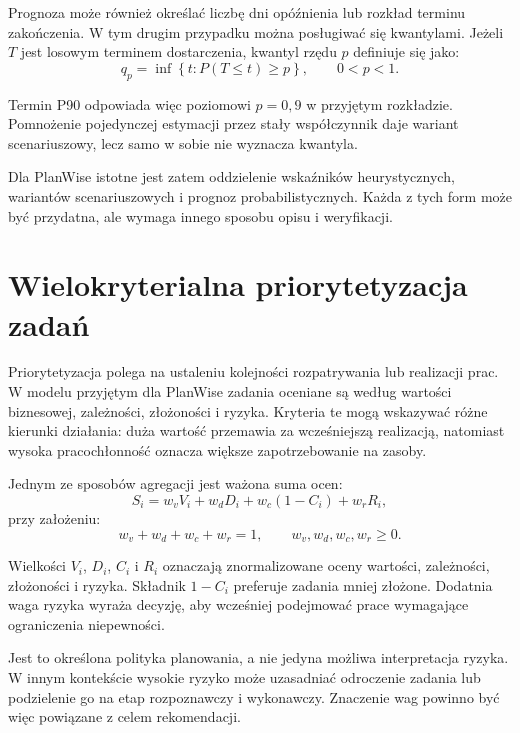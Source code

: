 Prognoza może również określać liczbę dni opóźnienia lub rozkład terminu zakończenia. W tym drugim przypadku można posługiwać się kwantylami. Jeżeli \(T\) jest losowym terminem dostarczenia, kwantyl rzędu \(p\) definiuje się jako:
\begin{equation}
    q_p = \inf\left\{t : P(T \leq t) \geq p\right\},
    \qquad 0 < p < 1.
    \label{eq:kwantyl-terminu}
\end{equation}

Termin P90 odpowiada więc poziomowi \(p = 0{,}9\) w przyjętym rozkładzie. Pomnożenie pojedynczej estymacji przez stały współczynnik daje wariant scenariuszowy, lecz samo w sobie nie wyznacza kwantyla.

Dla PlanWise istotne jest zatem oddzielenie wskaźników heurystycznych, wariantów scenariuszowych i prognoz probabilistycznych. Każda z tych form może być przydatna, ale wymaga innego sposobu opisu i weryfikacji.


\section{Wielokryterialna priorytetyzacja zadań}
\label{sec:priorytetyzacja-zadan}

Priorytetyzacja polega na ustaleniu kolejności rozpatrywania lub realizacji prac. W modelu przyjętym dla PlanWise zadania oceniane są według wartości biznesowej, zależności, złożoności i ryzyka. Kryteria te mogą wskazywać różne kierunki działania: duża wartość przemawia za wcześniejszą realizacją, natomiast wysoka pracochłonność oznacza większe zapotrzebowanie na zasoby.

Jednym ze sposobów agregacji jest ważona suma ocen:
\begin{equation}
    S_i =
    w_v V_i +
    w_d D_i +
    w_c(1 - C_i) +
    w_r R_i,
    \label{eq:ocena-priorytetu}
\end{equation}
przy założeniu:
\begin{equation}
    w_v + w_d + w_c + w_r = 1,
    \qquad
    w_v, w_d, w_c, w_r \geq 0.
    \label{eq:ograniczenia-wag}
\end{equation}

Wielkości \(V_i\), \(D_i\), \(C_i\) i \(R_i\) oznaczają znormalizowane oceny wartości, zależności, złożoności i ryzyka. Składnik \(1 - C_i\) preferuje zadania mniej złożone. Dodatnia waga ryzyka wyraża decyzję, aby wcześniej podejmować prace wymagające ograniczenia niepewności.

Jest to określona polityka planowania, a nie jedyna możliwa interpretacja ryzyka. W innym kontekście wysokie ryzyko może uzasadniać odroczenie zadania lub podzielenie go na etap rozpoznawczy i wykonawczy. Znaczenie wag powinno być więc powiązane z celem rekomendacji.

